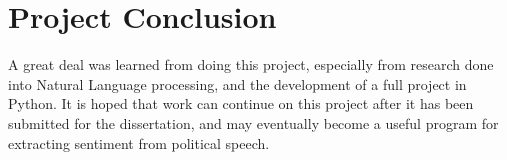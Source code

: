 \section{Project Conclusion}

A great deal was learned from doing this project, especially from research done into Natural Language processing, and the development of a full project in Python. It is hoped that work can continue on this project after it has been submitted for the dissertation, and may eventually become a useful program for extracting sentiment from political speech.